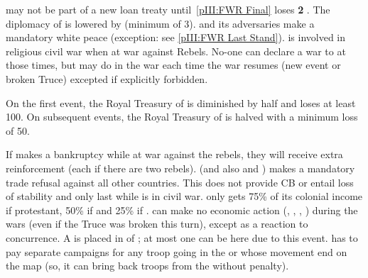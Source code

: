 \begin{digressions}



  \phevnt
  \aparag \FRA may not be part of a new loan treaty until~\ref{pIII:FWR Final}
  \aparag \FRA loses {\bf 2} \STAB.
  \aparag The diplomacy of \FRA is lowered by  (minimum of 3).
  \aparag \FRA and its adversaries make a mandatory white peace (exception:
  see \ref{pIII:FWR Last Stand}).
  \aparag \FRA is involved in religious civil war when at war against
  Rebels. No-one can declare a war to \FRA at those times, but \MAJ may do
   in the war each time the war resumes (new event
  or broken Truce) excepted if explicitly forbidden.



  \phevnt
  \aparag On the first event, the Royal Treasury of \FRA is diminished by half
  and loses at least 100\ducats.  On subsequent events, the Royal Treasury of
  \FRA is halved with a minimum loss of 50\ducats.

  \bparag If \FRA makes a bankruptcy while at war against the rebels, they
  will receive \ARMY\facemoins extra reinforcement (\LD each if there are two
  rebels).
  \aparag \FRA (and also \hug and \lig) makes a mandatory trade refusal
  against all other countries. This does not provide CB or entail loss of
  stability and only last while \FRA is in civil war.
  \bparag \FRA only gets 75\% of its colonial income if protestant, 50\% if
  \CATHCO and 25\% if \CATHCR.
  \aparag \FRA can make no economic action (\COL, \TP, \TFI, \CONC) during the
  wars (even if the Truce was broken this turn), except as a reaction to
  concurrence.
  \aparag A \PIRATE\faceplus is placed in \CTZ of \FRA; at most one \PIRATE
  can be here due to this event.
  \aparag \FRA has to pay separate campaigns for any troop going in the \ROTW
  or whose movement end on the \ROTW map (so, it can bring back troops from
  the \ROTW without penalty).



\end{digressions}
